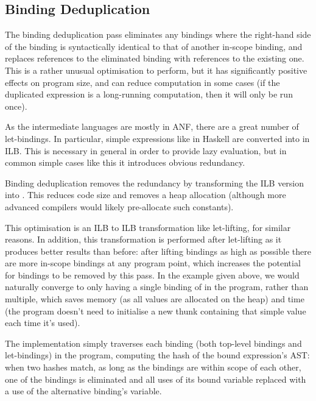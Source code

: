 \documentclass[dissertation.tex]{subfiles}
\begin{document}
{    \subsection{Binding Deduplication}\label{sec:binding-dedupe}
    {
        The binding deduplication pass eliminates any bindings where the right-hand side of the binding is syntactically identical to that of another in-scope binding, and replaces references to the eliminated binding with references to the existing one. This is a rather unusual optimisation to perform, but it has significantly positive effects on program size, and can reduce computation in some cases (if the duplicated expression is a long-running computation, then it will only be run once).

        As the intermediate languages are mostly in ANF, there are a great number of let-bindings. In particular, simple expressions like  in Haskell are converted into  in ILB. This is necessary in general in order to provide lazy evaluation, but in common simple cases like this it introduces obvious redundancy.
        
        Binding deduplication removes the redundancy by transforming the ILB version into . This reduces code size and removes a heap allocation (although more advanced compilers would likely pre-allocate such constants).

        This optimisation is an ILB to ILB transformation like let-lifting, for similar reasons. In addition, this transformation is performed after let-lifting as it produces better results than before: after lifting bindings as high as possible there are more in-scope bindings at any program point, which increases the potential for bindings to be removed by this pass. In the  example given above, we would naturally converge to only having a single binding of  in the program, rather than multiple, which saves memory (as all values are allocated on the heap) and time (the program doesn't need to initialise a new thunk containing that simple value each time it's used).

        The implementation simply traverses each binding (both top-level bindings and let-bindings) in the program, computing the hash of the bound expression's AST: when two hashes match, as long as the bindings are within scope of each other, one of the bindings is eliminated and all uses of its bound variable replaced with a use of the alternative binding's variable.
    }
}
\end{document}
